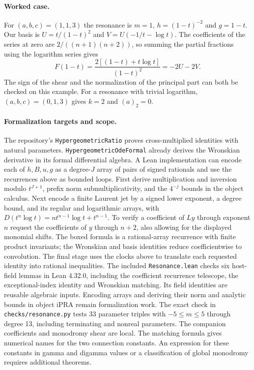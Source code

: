 \paragraph{Worked case.}
For $(a,b,c)=(1,1,3)$ the resonance is $m=1$,
$h=(1-t)^{-2}$ and $g=1-t$. Our basis is
$U=t/(1-t)^2$ and $V=U(-1/t-\log t)$.
The coefficients of the series at zero are $2/((n+1)(n+2))$,
so summing the partial fractions using the logarithm series gives
\[
 F(1-t)=\frac{2[(1-t)+t\log t]}{(1-t)^2}=-2U-2V .
\]
The sign of the shear and the normalization of the principal part can
both be checked on this example. For a resonance with trivial logarithm,
$(a,b,c)=(0,1,3)$ gives $k=2$ and $(a)_2=0$.

\paragraph{Formalization targets and scope.}
The repository's \texttt{HypergeometricRatio} proves cross-multiplied
identities with natural parameters. \texttt{HypergeometricOdeFormal}
already derives the Wronskian derivative in its formal differential
algebra. A Lean implementation can encode each of $h,B,u,g$ as a
degree-$J$ array of pairs of signed rationals and use the recurrences
above as bounded loops. First derive multiplication and inversion modulo
$t^{J+1}$, prefix norm submultiplicativity, and the $4^{-j}$ bounds in
the object calculus. Next encode a finite Laurent jet by a signed lower
exponent, a degree bound, and its regular and logarithmic arrays, with
$D(t^n\log t)=nt^{n-1}\log t+t^{n-1}$. To verify a coefficient of
$Ly$ through exponent $n$ request the coefficients of $y$ through $n+2$,
also allowing for the displayed monomial shifts. The boxed formula is
a rational-array recurrence with finite product invariants; the Wronskian
and basis identities reduce coefficientwise to convolution. The final
stage uses the clocks above to translate each requested identity into
rational inequalities. The included \texttt{Resonance.lean} checks six host-field
lemmas in Lean 4.32.0, including the coefficient recurrence telescope,
the exceptional-index identity and Wronskian matching. Its field
identities are reusable algebraic inputs. Encoding arrays and deriving
their norm and analytic bounds in object iPRA remain formalization work.
The exact check in \texttt{checks/resonance.py} tests 33 parameter triples
with $-5\le m\le5$ through degree 13, including terminating and
nonreal parameters. The companion coefficients and monodromy shear
are local. The matching formula gives numerical names for the two
connection constants. An expression for these constants in gamma and
digamma values or a classification of global monodromy requires additional
theorems.

